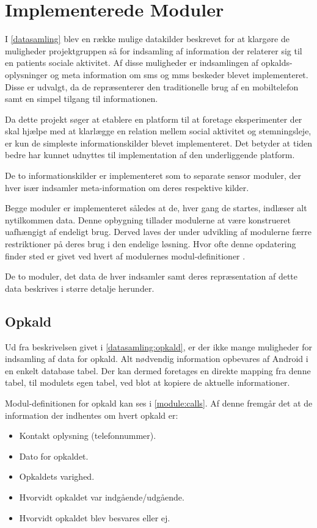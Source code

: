 \section{Implementerede Moduler}
I \cref{datasamling} blev en række mulige datakilder beskrevet for at klargøre de muligheder projektgruppen så for indsamling af information der relaterer sig til en patients sociale aktivitet.
Af disse muligheder er indsamlingen af opkalds-oplysninger og meta information om sms og mms beskeder blevet implementeret.
Disse er udvalgt, da de repræsenterer den traditionelle brug af en mobiltelefon samt en simpel tilgang til informationen.

Da dette projekt søger at etablere en platform til at foretage eksperimenter der skal hjælpe med at klarlægge en relation mellem social aktivitet og stemningsleje, er kun de simpleste informationskilder blevet implementeret.
Det betyder at tiden bedre har kunnet udnyttes til implementation af den underliggende platform.

De to informationskilder er implementeret som to separate sensor moduler, der hver især indsamler meta-information om deres respektive kilder.

Begge moduler er implementeret således at de, hver gang de startes, indlæser alt nytilkommen data.
Denne opbygning tillader modulerne at være konstrueret uafhængigt af endeligt brug.
Derved laves der under udvikling af modulerne færre restriktioner på deres brug i den endelige løsning.
Hvor ofte denne opdatering finder sted er givet ved hvert af modulernes modul-definitioner .

De to moduler, det data de hver indsamler samt deres repræsentation af dette data beskrives i større detalje herunder.

\subsection{Opkald}
Ud fra beskrivelsen givet i \cref{datasamling:opkald}, er der ikke mange muligheder for indsamling af data for opkald.
Alt nødvendig information opbevares af Android i en enkelt database tabel.
Der kan dermed foretages en direkte mapping fra denne tabel, til modulets egen tabel, ved blot at kopiere de aktuelle informationer.

Modul-definitionen for opkald kan ses i \cref{module:calls}.
Af denne fremgår det at de information der indhentes om hvert opkald er:
\begin{itemize}
\item Kontakt oplysning (telefonnummer).
\item Dato for opkaldet.
\item Opkaldets varighed.
\item Hvorvidt opkaldet var indgående/udgående.
\item Hvorvidt opkaldet blev besvares eller ej.
\end{itemize}

